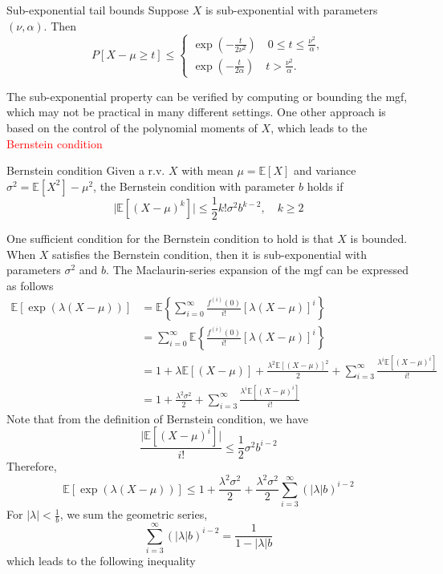 \documentclass[10pt,handout,english]{beamer}
\newcommand{\E}{\mathbb{E}}
\begin{document}
\begin{frame}[allowframebreaks]
\begin{block}{Sub-exponential tail bounds}
Suppose $X$ is sub-exponential with parameters $(\nu,\alpha)$. Then
\[
P[X-\mu\geq t]\leq
\begin{cases}
\exp\left(-\frac{t}{2\nu^2}\right)\quad 0\leq t\leq\frac{\nu^2}{\alpha},\\
\exp\left(-\frac{t}{2\alpha}\right)\quad t>\frac{\nu^2}{\alpha}.
\end{cases}
\]
\end{block}
The sub-exponential property can be verified by computing or bounding the mgf, which may not be practical in many different settings. One other approach is based on the control of the polynomial moments of $X$, which leads to the \textcolor{red}{Bernstein condition}
\begin{block}{Bernstein condition}
Given a r.v. $X$ with mean $\mu=\E[X]$ and variance $\sigma^2=\E[X^2]-\mu^2$, the Bernstein condition with parameter $b$ holds if
\[
\lvert \E[(X-\mu)^k]\rvert\leq\frac{1}{2}k!\sigma^2b^{k-2},\quad k\geq 2
\]
\end{block} 
One sufficient condition for the Bernstein condition to hold is that $X$ is bounded. When $X$ satisfies the Bernstein condition, then it is sub-exponential with parameters $\sigma^2$ and $b$. The Maclaurin-series expansion of the mgf can be expressed as follows
\begin{align*}
\E[\exp(\lambda(X-\mu))]&=\E\left\{\sum\limits_{i=0}^{\infty}\frac{f^{(i)}(0)}{i!}\left[\lambda(X-\mu)\right]^i\right\}\\
&=\sum\limits_{i=0}^{\infty}\E\left\{\frac{f^{(i)}(0)}{i!}\left[\lambda(X-\mu)\right]^i\right\}\\
&=1+\lambda\E[(X-\mu)]+\frac{\lambda^2\E[(X-\mu)]^2}{2}+\sum\limits_{i=3}^{\infty}\frac{\lambda^i\E[(X-\mu)^i]}{i!}\\
&=1+\frac{\lambda^2\sigma^2}{2}+\sum\limits_{i=3}^{\infty}\frac{\lambda^i\E[(X-\mu)^i]}{i!}
\end{align*}
Note that from the definition of Bernstein condition, we have
\[
\frac{\lvert \E[(X-\mu)^i]\rvert}{i!}\leq\frac{1}{2}\sigma^2b^{i-2}
\]
Therefore,
\[
\E[\exp(\lambda(X-\mu))]\leq1+\frac{\lambda^2\sigma^2}{2}+\frac{\lambda^2\sigma^2}{2}\sum\limits_{i=3}^{\infty}(\lvert\lambda \rvert b)^{i-2}
\]
For $\lvert\lambda\rvert<\frac{1}{b}$, we sum the geometric series,
\[
\sum\limits_{i=3}^{\infty}(\lvert\lambda \rvert b)^{i-2}=\frac{1}{1-\lvert\lambda\rvert b}
\] 
which leads to the following inequality

\end{frame}
\end{document}
